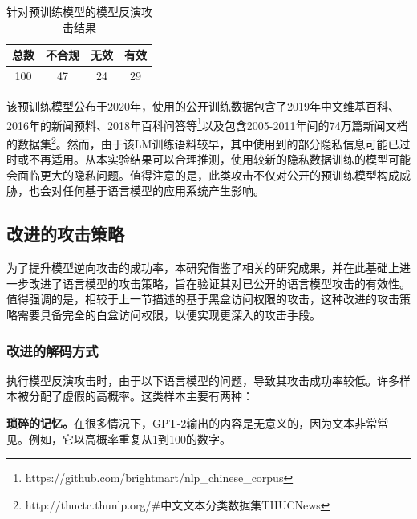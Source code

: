\begin{table}[]
	\centering
	\caption{针对预训练模型的模型反演攻击结果}
	\begin{tabular}{|c|c|c|c|}
		\hline
		总数&不合规&无效&有效   \\ \hline
		100&47&24&29    \\ \hline
	\end{tabular}
	\label{Prefix_Attack_Table}
\end{table}


该预训练模型公布于2020年，使用的公开训练数据包含了2019年中文维基百科、2016年的新闻预料、2018年百科问答等\footnote{https://github.com/brightmart/nlp\_chinese\_corpus}以及包含2005-2011年间的74万篇新闻文档的数据集\footnote{http://thuctc.thunlp.org/\#中文文本分类数据集THUCNews}。然而，由于该LM训练语料较早，其中使用到的部分隐私信息可能已过时或不再适用。从本实验结果可以合理推测，使用较新的隐私数据训练的模型可能会面临更大的隐私问题。值得注意的是，此类攻击不仅对公开的预训练模型构成威胁，也会对任何基于语言模型的应用系统产生影响。

\subsection{改进的攻击策略} \label{rem_attack_strate}

为了提升模型逆向攻击的成功率，本研究借鉴了相关的研究成果\cite{Extrac_Train_Data_From_LM}，并在此基础上进一步改进了语言模型的攻击策略，旨在验证其对已公开的语言模型攻击的有效性。值得强调的是，相较于上一节描述的基于黑盒访问权限的攻击，这种改进的攻击策略需要具备完全的白盒访问权限，以便实现更深入的攻击手段。

\subsubsection{改进的解码方式}

执行模型反演攻击时，由于以下语言模型的问题，导致其攻击成功率较低。许多样本被分配了虚假的高概率。这类样本主要有两种：

\textbf{琐碎的记忆。}在很多情况下，GPT-2输出的内容是无意义的，因为文本非常常见。例如，它以高概率重复从1到100的数字。

